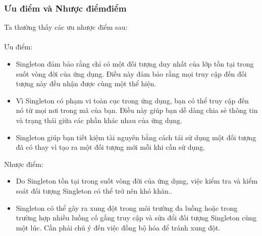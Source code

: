 \subsubsection{Ưu điểm và Nhược điểmđiểm}
Ta thường thấy các ưu nhược điểm sau:\\\\
Ưu điểm:
\begin{itemize}
    \item Singleton đảm bảo rằng chỉ có một đối tượng duy nhất của lớp tồn tại trong suốt vòng đời của ứng dụng. Điều này đảm bảo rằng mọi truy cập đến đối tượng này đều nhận được cùng một thể hiện.
    \item Vì Singleton có phạm vi toàn cục trong ứng dụng, bạn có thể truy cập đến nó từ mọi nơi trong mã của bạn. Điều này giúp bạn dễ dàng chia sẻ thông tin và trạng thái giữa các phần khác nhau của ứng dụng.
    \item Singleton giúp bạn tiết kiệm tài nguyên bằng cách tái sử dụng một đối tượng đã có thay vì tạo ra một đối tượng mới mỗi khi cần sử dụng.
\end{itemize}
Nhược điểm:
\begin{itemize}
    \item Do Singleton tồn tại trong suốt vòng đời của ứng dụng, việc kiểm tra và kiểm soát đối tượng Singleton có thể trở nên khó khăn..
    \item Singleton có thể gây ra xung đột trong môi trường đa luồng hoặc trong trường hợp nhiều luồng cố gắng truy cập và sửa đổi đối tượng Singleton cùng một lúc. Cần phải chú ý đến việc đồng bộ hóa để tránh xung đột.
\end{itemize}
